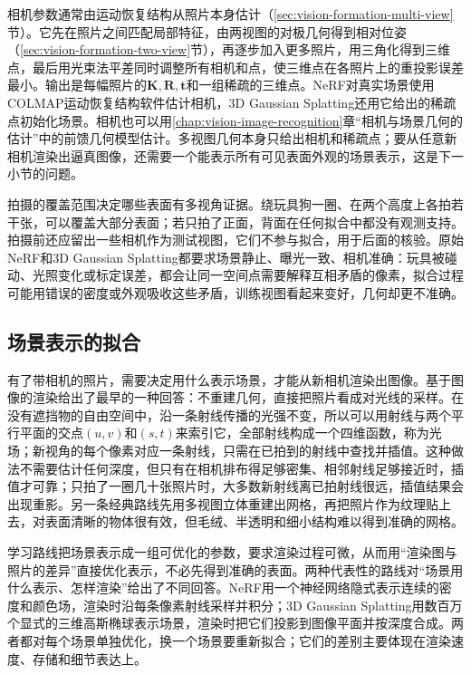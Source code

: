 相机参数通常由运动恢复结构从照片本身估计（\ref{sec:vision-formation-multi-view}节）。它先在照片之间匹配局部特征，由两视图的对极几何得到相对位姿（\ref{sec:vision-formation-two-view}节），再逐步加入更多照片，用三角化得到三维点，最后用光束法平差同时调整所有相机和点，使三维点在各照片上的重投影误差最小。输出是每幅照片的$\bm{K},\bm{R},\bm{t}$和一组稀疏的三维点。NeRF对真实场景使用COLMAP运动恢复结构软件估计相机，3D Gaussian Splatting还用它给出的稀疏点初始化场景。相机也可以用\ref{chap:vision-image-recognition}章“相机与场景几何的估计”中的前馈几何模型估计。多视图几何本身只给出相机和稀疏点；要从任意新相机渲染出逼真图像，还需要一个能表示所有可见表面外观的场景表示，这是下一小节的问题。

拍摄的覆盖范围决定哪些表面有多视角证据。绕玩具狗一圈、在两个高度上各拍若干张，可以覆盖大部分表面；若只拍了正面，背面在任何拟合中都没有观测支持。拍摄前还应留出一些相机作为测试视图，它们不参与拟合，用于后面的核验。原始NeRF和3D Gaussian Splatting都要求场景静止、曝光一致、相机准确：玩具被碰动、光照变化或标定误差，都会让同一空间点需要解释互相矛盾的像素，拟合过程可能用错误的密度或外观吸收这些矛盾，训练视图看起来变好，几何却更不准确。

\subsection{场景表示的拟合}
\label{sec:vision-generation-scene-fitting}

有了带相机的照片，需要决定用什么表示场景，才能从新相机渲染出图像。基于图像的渲染给出了最早的一种回答：不重建几何，直接把照片看成对光线的采样。在没有遮挡物的自由空间中，沿一条射线传播的光强不变，所以可以用射线与两个平行平面的交点$(u,v)$和$(s,t)$来索引它，全部射线构成一个四维函数，称为光场；新视角的每个像素对应一条射线，只需在已拍到的射线中查找并插值。这种做法不需要估计任何深度，但只有在相机排布得足够密集、相邻射线足够接近时，插值才可靠；只拍了一圈几十张照片时，大多数新射线离已拍射线很远，插值结果会出现重影。另一条经典路线先用多视图立体重建出网格，再把照片作为纹理贴上去，对表面清晰的物体很有效，但毛绒、半透明和细小结构难以得到准确的网格。

学习路线把场景表示成一组可优化的参数，要求渲染过程可微，从而用“渲染图与照片的差异”直接优化表示，不必先得到准确的表面。两种代表性的路线对“场景用什么表示、怎样渲染”给出了不同回答。NeRF用一个神经网络隐式表示连续的密度和颜色场，渲染时沿每条像素射线采样并积分；3D Gaussian Splatting用数百万个显式的三维高斯椭球表示场景，渲染时把它们投影到图像平面并按深度合成。两者都对每个场景单独优化，换一个场景要重新拟合；它们的差别主要体现在渲染速度、存储和细节表达上。


